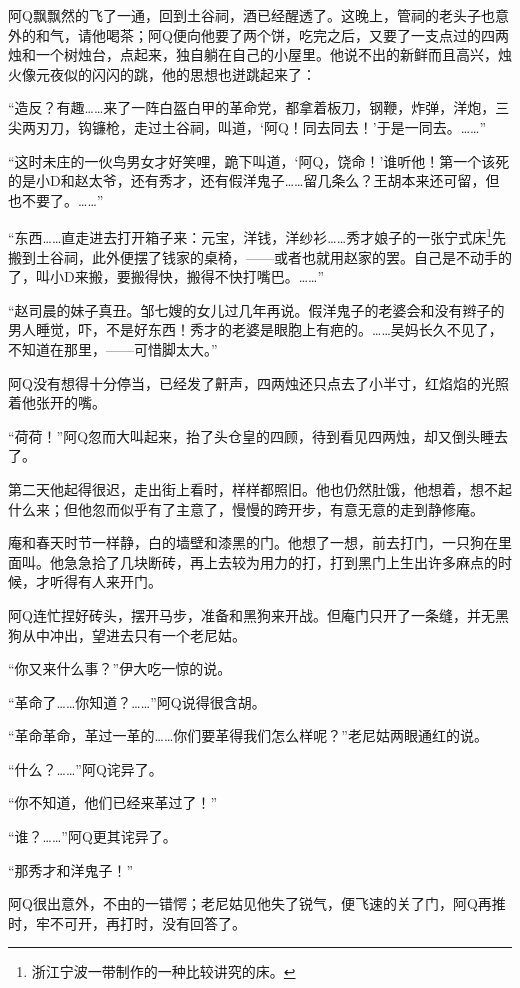 \documentclass[12pt,UTF8]{ctexbook}
\begin{document}
阿Q飘飘然的飞了一通，回到土谷祠，酒已经醒透了。这晚上，管祠的老头子也意外的和气，请他喝茶；阿Q便向他要了两个饼，吃完之后，又要了一支点过的四两烛和一个树烛台，点起来，独自躺在自己的小屋里。他说不出的新鲜而且高兴，烛火像元夜似的闪闪的跳，他的思想也迸跳起来了：

“造反？有趣……来了一阵白盔白甲的革命党，都拿着板刀，钢鞭，炸弹，洋炮，三尖两刃刀，钩镰枪，走过土谷祠，叫道，‘阿Q！同去同去！’于是一同去。……”

“这时未庄的一伙鸟男女才好笑哩，跪下叫道，‘阿Q，饶命！’谁听他！第一个该死的是小D和赵太爷，还有秀才，还有假洋鬼子……留几条么？王胡本来还可留，但也不要了。……”

“东西……直走进去打开箱子来：元宝，洋钱，洋纱衫……秀才娘子的一张宁式床\footnote{浙江宁波一带制作的一种比较讲究的床。}先搬到土谷祠，此外便摆了钱家的桌椅，——或者也就用赵家的罢。自己是不动手的了，叫小D来搬，要搬得快，搬得不快打嘴巴。……”

“赵司晨的妹子真丑。邹七嫂的女儿过几年再说。假洋鬼子的老婆会和没有辫子的男人睡觉，吓，不是好东西！秀才的老婆是眼胞上有疤的。……吴妈长久不见了，不知道在那里，——可惜脚太大。”

阿Q没有想得十分停当，已经发了鼾声，四两烛还只点去了小半寸，红焰焰的光照着他张开的嘴。

“荷荷！”阿Q忽而大叫起来，抬了头仓皇的四顾，待到看见四两烛，却又倒头睡去了。

第二天他起得很迟，走出街上看时，样样都照旧。他也仍然肚饿，他想着，想不起什么来；但他忽而似乎有了主意了，慢慢的跨开步，有意无意的走到静修庵。

庵和春天时节一样静，白的墙壁和漆黑的门。他想了一想，前去打门，一只狗在里面叫。他急急拾了几块断砖，再上去较为用力的打，打到黑门上生出许多麻点的时候，才听得有人来开门。

阿Q连忙捏好砖头，摆开马步，准备和黑狗来开战。但庵门只开了一条缝，并无黑狗从中冲出，望进去只有一个老尼姑。

“你又来什么事？”伊大吃一惊的说。

“革命了……你知道？……”阿Q说得很含胡。

“革命革命，革过一革的……你们要革得我们怎么样呢？”老尼姑两眼通红的说。

“什么？……”阿Q诧异了。

“你不知道，他们已经来革过了！”

“谁？……”阿Q更其诧异了。

“那秀才和洋鬼子！”

阿Q很出意外，不由的一错愕；老尼姑见他失了锐气，便飞速的关了门，阿Q再推时，牢不可开，再打时，没有回答了。
\end{document}
